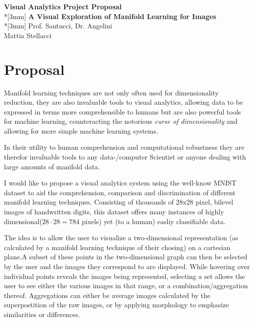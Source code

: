 \documentclass[9pt, letterpaper]{article}
\begin{document}
\begin{center}
{\Large{\bf Visual Analytics Project Proposal}}\\*[3mm]
{\bf A Visual Exploration of Manifold Learning for Images } \\*[3mm]
Prof. Santucci, Dr. Angelini\\
Mattia Stellacci
\end{center}



\section{Proposal}

Manifold learning techniques are not only often used for dimensionality reduction, they are also invaluable tools to visual analytics, allowing data to be expressed in terms  more comprehensible to humans but are also powerful tools for machine learning, counteracting the notorious \textit{curse of dimensionality} and allowing for more simple machine learning systems.  

In their utility to human comprehension and computational robustness they are therefor invaluable tools to any data-/computer Scientist or anyone dealing with large amounts of manifold data. 

I would like to propose a visual analytics system using the well-know MNIST dataset to aid the comprehension, comparison and discrimination of different manifold learning techniques.  Consisting of thousands of 28x28 pixel, bilevel images of handwritten digits, this dataset offers many instances of highly dimensional($28\cdot28= 784$ pixels)  yet (to a human) easliy classifiable data.

The idea is to allow the user to visualize a two-dimensional representation (as calculated by a manifold learning technique of their chosing) on a cartesian plane.A subset of these points in the two-dimensional graph can then be selected by the user and the images they correspond to are displayed. While hovering over individual points reveals the images being represented, selecting a set allows the user to see either the various images in that range, or a combination/aggregation thereof. Aggregations can either be average images calculated by the superpostition of the raw images, or by applying morphology to emphasize similarities or differences.       

\vspace{15pt}
\end{document}
